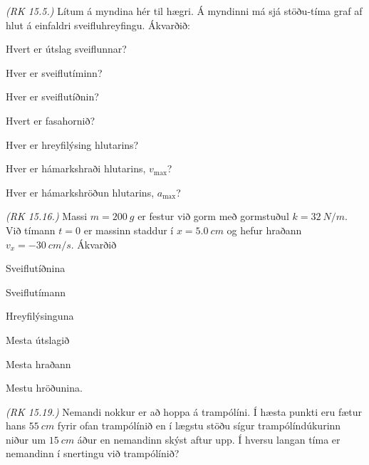 \begin{enumerate}[label = \textbf{Dæmi \thechapter.\arabic*.}]
\begin{minipage}{\linewidth}
\item \textit{(RK 15.5.)} Lítum á myndina hér til hægri. Á myndinni má sjá stöðu-tíma graf af hlut á einfaldri sveifluhreyfingu. Ákvarðið: \begin{enumerate*}[label = \textbf{(\alph*)}]
    \item Hvert er útslag sveiflunnar?
    \item Hver er sveiflutíminn?
    \item Hver er sveiflutíðnin?
    \item Hvert er fasahornið?
    \item Hver er hreyfilýsing hlutarins?
    \item Hver er hámarkshraði hlutarins, $v_{\text{max}}$?
    \item Hver er hámarkshröðun hlutarins, $a_{\text{max}}$?
\end{enumerate*}
\end{minipage}

\vspace{0.1cm}

\item \textit{(RK 15.16.)} Massi $m = \SI{200}{g}$ er festur við gorm með gormstuðul $k = \SI{32}{N/m}$. Við tímann $t = 0$ er massinn staddur í $x = \SI{5.0}{cm}$ og hefur hraðann $v_x = \SI{-30}{cm/s}$. Ákvarðið \begin{enumerate*}[label = \textbf{(\alph*)}]
    \item Sveiflutíðnina
    \item Sveiflutímann
    \item Hreyfilýsinguna
    \item Mesta útslagið
    \item Mesta hraðann
    \item Mestu hröðunina.
\end{enumerate*}

\item \textit{(RK 15.19.)} Nemandi nokkur er að hoppa á trampólíni. Í hæsta punkti eru fætur hans $\SI{55}{cm}$ fyrir ofan trampólínið en í lægstu stöðu sígur trampólíndúkurinn niður um $\SI{15}{cm}$ áður en nemandinn skýst aftur upp. Í hversu langan tíma er nemandinn í snertingu við trampólínið?

\end{enumerate}
